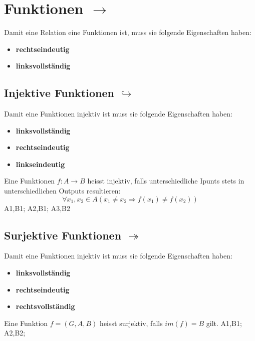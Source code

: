 \section{Funktionen $\rightarrow$}
Damit eine Relation eine Funktionen ist, muss sie folgende Eigenschaften haben:
\begin{itemize}
    \item \textbf{rechtseindeutig}
    \item \textbf{linksvollständig}
\end{itemize}
\subsection{Injektive Funktionen $\hookrightarrow$}
Damit eine Funktionen injektiv ist muss sie folgende Eigenschaften haben:
\begin{itemize}
    \item \textbf{linksvollständig}
    \item \textbf{rechtseindeutig}
    \item \textbf{linkseindeutig}
\end{itemize}
Eine Funktionen $f : A \rightarrow B$ heisst injektiv, falls unterschiedliche Ipunts stets in
unterschiedlichen Outputs resultieren:
\begin{equation}
    \forall{x_1, x_2} \in A(x_1 \neq x_2 \Rightarrow f(x_1) \neq f(x_2))
\end{equation}
\newline
{}
    {
    A1,B1;
    A2,B1;
    A3,B2
    }
\injektiv{}
\newline
\newline
\subsection{Surjektive Funktionen $\twoheadrightarrow$}
Damit eine Funktionen injektiv ist muss sie folgende Eigenschaften haben:
\begin{itemize}
    \item \textbf{linksvollständig}
    \item \textbf{rechtseindeutig}
    \item \textbf{rechtsvollständig}
\end{itemize}
Eine Funktion $f = (G,A,B)$ heisst surjektiv, falls $im(f) = B$ gilt.
\newline
\newline
{}
    {
    A1,B1;
    A2,B2;
    }
\surjektiv{}
\newline

